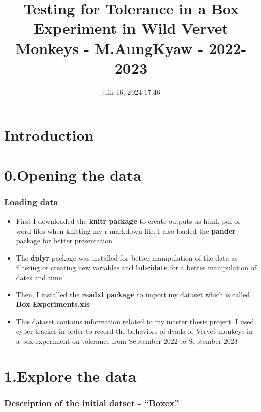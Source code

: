 \documentclass[
]{article}
\title{Testing for Tolerance in a Box Experiment in Wild Vervet Monkeys
- M.AungKyaw - 2022-2023}
\author{}
\date{\vspace{-2.5em}juin 16, 2024 17:46}
\providecommand{\tightlist}{%
  \setlength{\itemsep}{0pt}\setlength{\parskip}{0pt}}
\begin{document}
\maketitle

{
\setcounter{tocdepth}{6}
\tableofcontents
}
\hypertarget{introduction}{%
\section{Introduction}\label{introduction}}

\hypertarget{opening-the-data}{%
\section{0.Opening the data}\label{opening-the-data}}

\hypertarget{loading-data}{%
\subsubsection{Loading data}\label{loading-data}}

\begin{itemize}
\tightlist
\item
  First I downloaded the \textbf{knitr package} to create outputs as
  html, pdf or word files when knitting my r markdown file. I also
  loaded the \textbf{pander} package for better presentation
\item
  The \textbf{dplyr} package was installed for better manipulation of
  the data as filtering or creating new variables and \textbf{lubridate}
  for a better manipulation of dates and time
\item
  Then, I installed the \textbf{readxl package} to import my dataset
  which is called \textbf{Box Experiments.xls}
\item
  This dataset contains information related to my master thesis project.
  I used cyber tracker in order to record the behaviors of dyads of
  Vervet monkeys in a box experiment on tolerance from September 2022 to
  September 2023
\end{itemize}

\hypertarget{explore-the-data}{%
\section{1.Explore the data}\label{explore-the-data}}

\hypertarget{description-of-the-initial-datset---boxex}{%
\subsubsection{Description of the initial datset -
``Boxex''}\label{description-of-the-initial-datset---boxex}}
\end{document}
